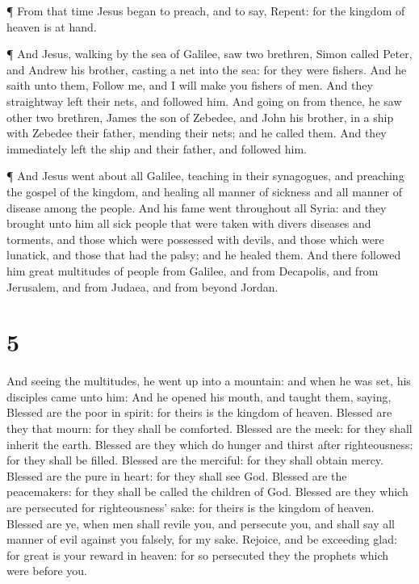  ¶ From that time Jesus began to preach, and to say,
Repent: for the kingdom of heaven is at hand.

 ¶ And Jesus, walking by the sea of Galilee, saw two
brethren, Simon called Peter, and Andrew his brother, casting a net into
the sea: for they were fishers.  And he saith unto them,
Follow me, and I will make you fishers of men.  And they
straightway left their nets, and followed him.  And going
on from thence, he saw other two brethren, James the son of Zebedee, and
John his brother, in a ship with Zebedee their father, mending their
nets; and he called them.  And they immediately left the
ship and their father, and followed him.

 ¶ And Jesus went about all Galilee, teaching in their
synagogues, and preaching the gospel of the kingdom, and healing all
manner of sickness and all manner of disease among the people.
 And his fame went throughout all Syria: and they brought
unto him all sick people that were taken with divers diseases and
torments, and those which were possessed with devils, and those which
were lunatick, and those that had the palsy; and he healed them.
 And there followed him great multitudes of people from
Galilee, and from Decapolis, and from Jerusalem, and from Judaea, and
from beyond Jordan.

\hypertarget{section-4}{%
\section{5}\label{section-4}}

 And seeing the multitudes, he went up into a mountain: and
when he was set, his disciples came unto him:  And he opened
his mouth, and taught them, saying,  Blessed are the poor in
spirit: for theirs is the kingdom of heaven.  Blessed are
they that mourn: for they shall be comforted.  Blessed are
the meek: for they shall inherit the earth.  Blessed are
they which do hunger and thirst after righteousness: for they shall be
filled.  Blessed are the merciful: for they shall obtain
mercy.  Blessed are the pure in heart: for they shall see
God.  Blessed are the peacemakers: for they shall be called
the children of God.  Blessed are they which are persecuted
for righteousness' sake: for theirs is the kingdom of heaven.
 Blessed are ye, when men shall revile you, and persecute
you, and shall say all manner of evil against you falsely, for my sake.
 Rejoice, and be exceeding glad: for great is your reward
in heaven: for so persecuted they the prophets which were before you.

